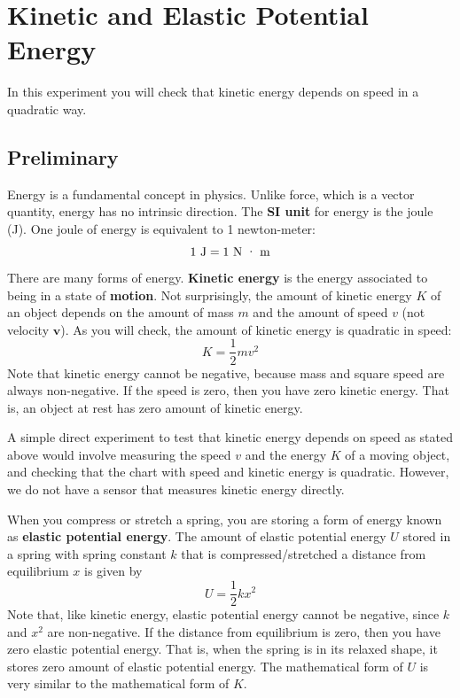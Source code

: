 \setcounter{chapter}{5}
\chapter{Kinetic and Elastic Potential Energy}
%
In this experiment you will check that kinetic energy depends on speed in a quadratic way.
%
\section{Preliminary}
%
Energy is a fundamental concept in physics. Unlike force, which is a vector quantity, energy has no intrinsic direction. The \textbf{SI unit} for energy is the joule (J). One joule of energy is equivalent to 1 newton-meter:
\begin{equation}
    1 \ \text{J} = 1 \ \text{N {\textperiodcentered} m}
\end{equation}
There are many forms of energy. \textbf{Kinetic energy} is the energy associated to being in a state of \textbf{motion}. Not surprisingly, the amount of kinetic energy $K$ of an object depends on the amount of mass $m$ and the amount of speed $v$ (not velocity $\mathbf{v}$). As you will check, the amount of kinetic energy is quadratic in speed:
\begin{equation}
    K = \frac{1}{2} m v^{2}
\end{equation}
Note that kinetic energy cannot be negative, because mass and square speed are always non-negative. If the speed is zero, then you have zero kinetic energy. That is, an object at rest has zero amount of kinetic energy.

A simple direct experiment to test that kinetic energy depends on speed as stated above would involve measuring the speed $v$ and the energy $K$ of a moving object, and checking that the chart with speed and kinetic energy is quadratic. However, we do not have a sensor that measures kinetic energy directly.

When you compress or stretch a spring, you are storing a form of energy known as \textbf{elastic potential energy}. The amount of elastic potential energy $U$ stored in a spring with spring constant $k$ that is compressed/stretched a distance from equilibrium $x$ is given by
\begin{equation}
    U = \frac{1}{2} k x^{2}
\end{equation}
Note that, like kinetic energy, elastic potential energy cannot be negative, since $k$ and $x^{2}$ are non-negative. If the distance from equilibrium is zero, then you have zero elastic potential energy. That is, when the spring is in its relaxed shape, it stores zero amount of elastic potential energy. The mathematical form of $U$ is very similar to the mathematical form of $K$.
%
